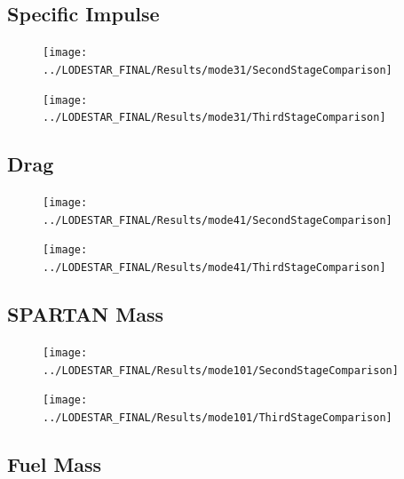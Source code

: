 \subsection{Specific Impulse}
\begin{figure}[th]
\centering
\texttt{[image: ../LODESTAR\_FINAL/Results/mode31/SecondStageComparison]}
\caption{}
\label{fig:SecondStageComparison10}
\end{figure}

\begin{figure}[th]
\centering
\texttt{[image: ../LODESTAR\_FINAL/Results/mode31/ThirdStageComparison]}
\caption{}
\label{fig:ThirdStageComparison10}
\end{figure}



\subsection{Drag}
\begin{figure}[th]
\centering
\texttt{[image: ../LODESTAR\_FINAL/Results/mode41/SecondStageComparison]}
\caption{}
\label{fig:SecondStageComparison11}
\end{figure}

\begin{figure}[th]
\centering
\texttt{[image: ../LODESTAR\_FINAL/Results/mode41/ThirdStageComparison]}
\caption{}
\label{fig:ThirdStageComparison11}
\end{figure}



\subsection{SPARTAN Mass}

\begin{figure}[th]
\centering
\texttt{[image: ../LODESTAR\_FINAL/Results/mode101/SecondStageComparison]}
\caption{}
\label{fig:SecondStageComparison12}
\end{figure}

\begin{figure}[th]
\centering
\texttt{[image: ../LODESTAR\_FINAL/Results/mode101/ThirdStageComparison]}
\caption{}
\label{fig:ThirdStageComparison12}
\end{figure}


\subsection{Fuel Mass}

